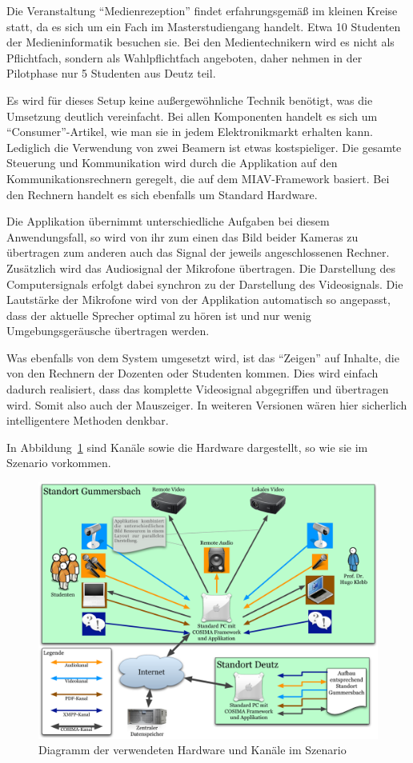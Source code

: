   Die Veranstaltung "`Medienrezeption"' findet erfahrungsgemäß im kleinen Kreise statt, da es sich um ein Fach im Masterstudiengang handelt. Etwa 10 Studenten der Medieninformatik besuchen sie. Bei den Medientechnikern wird es nicht als Pflichtfach, sondern als Wahlpflichtfach angeboten, daher nehmen in der Pilotphase nur 5 Studenten aus Deutz teil.

  Es wird für dieses Setup keine außergewöhnliche Technik benötigt, was die Umsetzung deutlich vereinfacht. Bei allen Komponenten handelt es sich um "`Consumer"'-Artikel, wie man sie in jedem Elektronikmarkt erhalten kann. Lediglich die Verwendung von zwei Beamern ist etwas kostspieliger. Die gesamte Steuerung und Kommunikation wird durch die Applikation auf den Kommunikationsrechnern geregelt, die auf dem MIAV-Framework basiert. Bei den Rechnern handelt es sich ebenfalls um Standard Hardware.

  Die Applikation übernimmt unterschiedliche Aufgaben bei diesem Anwendungsfall, so wird von ihr zum einen das Bild beider Kameras zu übertragen zum anderen auch das Signal der jeweils angeschlossenen Rechner. Zusätzlich wird das Audiosignal der Mikrofone übertragen. Die Darstellung des Computersignals erfolgt dabei synchron zu der Darstellung des Videosignals. Die Lautstärke der Mikrofone wird von der Applikation automatisch so angepasst, dass der aktuelle Sprecher optimal zu hören ist und nur wenig Umgebungsgeräusche übertragen werden.

  Was ebenfalls von dem System umgesetzt wird, ist das "`Zeigen"' auf Inhalte, die von den Rechnern der Dozenten oder Studenten kommen. Dies wird einfach dadurch realisiert, dass das komplette Videosignal abgegriffen und übertragen wird. Somit also auch der Mauszeiger. In weiteren Versionen wären hier sicherlich intelligentere Methoden denkbar.

  In Abbildung~\ref{fig:images_Hardware_und_Kanaele} sind Kanäle sowie die Hardware dargestellt, so wie sie im Szenario vorkommen.

\begin{figure}[ht]
  \centering
    \includegraphics[width=.9\textwidth]{images/Hardware_und_Kanaele.pdf}
  \caption{Diagramm der verwendeten Hardware und Kanäle im Szenario}
  \label{fig:images_Hardware_und_Kanaele}
\end{figure}

